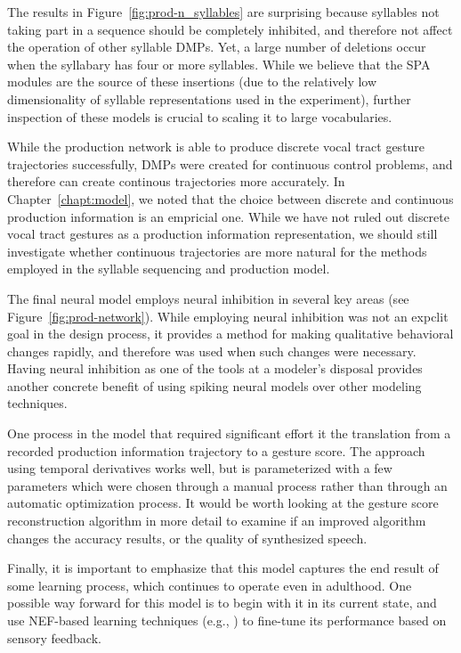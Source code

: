 The results in Figure~\ref{fig:prod-n_syllables}
are surprising because syllables
not taking part in a sequence
should be completely inhibited,
and therefore not affect the
operation of other syllable DMPs.
Yet, a large number of deletions
occur when the syllabary has
four or more syllables.
While we believe that the SPA modules
are the source of these insertions
(due to the relatively low
dimensionality of syllable representations
used in the experiment),
further inspection of these models
is crucial to scaling it to large vocabularies.

While the production network is able to produce
discrete vocal tract gesture trajectories successfully,
DMPs were created for continuous control problems,
and therefore can create continous trajectories
more accurately.
In Chapter~\ref{chapt:model},
we noted that the choice between discrete
and continuous production information
is an empricial one.
While we have not ruled out discrete
vocal tract gestures
as a production information representation,
we should still investigate whether
continuous trajectories are
more natural for the methods
employed in the syllable sequencing and production model.

The final neural model employs neural inhibition
in several key areas
(see Figure~\ref{fig:prod-network}).
While employing neural inhibition was not
an expclit goal in the design process,
it provides a method for
making qualitative behavioral changes rapidly,
and therefore was used when such changes
were necessary.
Having neural inhibition
as one of the tools
at a modeler's disposal
provides another concrete benefit
of using spiking neural models
over other modeling techniques.

One process in the model that
required significant effort
it the translation from
a recorded production information trajectory
to a gesture score.
The approach using temporal derivatives
works well,
but is parameterized with a few parameters
which were chosen through a manual process
rather than through an
automatic optimization process.
It would be worth looking at the
gesture score reconstruction algorithm
in more detail to examine if
an improved algorithm changes
the accuracy results,
or the quality of synthesized speech.

Finally, it is important to emphasize that
this model captures the end result
of some learning process,
which continues to operate
even in adulthood.
One possible way forward for this model
is to begin with it in its current state,
and use NEF-based learning techniques
(e.g., \citealt{macneil2011,bekolay2013a})
to fine-tune its performance based on
sensory feedback.


